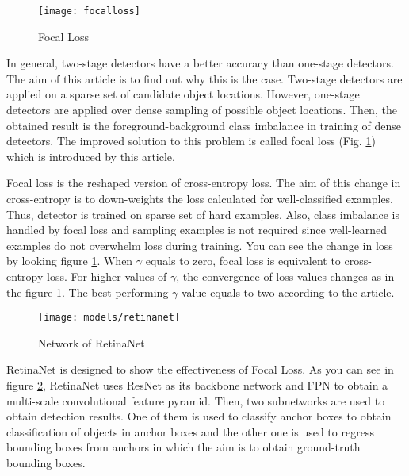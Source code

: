 \documentclass{article}
\begin{document}
\setlength{\parindent}{6ex}

\begin{figure}
    \centering
    \texttt{[image: focalloss]}
    \caption{Focal Loss}
    \label{fig:focalloss1}
\end{figure}

\indent

In general, two-stage detectors have a better accuracy than one-stage 
detectors. The aim of this article is to find out why this is the case. 
Two-stage detectors are applied on a sparse set of candidate object 
locations. However, one-stage detectors are applied over dense sampling 
of possible object locations. Then, the obtained result is the 
foreground-background class imbalance in training of dense detectors.
The improved solution to this problem is called focal loss (Fig. 
\ref{fig:focalloss1}) which is introduced by this article. \par

Focal loss is the reshaped version of cross-entropy loss. The aim of 
this change in cross-entropy is to down-weights the loss calculated for 
well-classified examples. Thus, detector is trained on sparse set of 
hard examples. Also, class imbalance is handled by focal loss and 
sampling examples is not required since well-learned examples do not 
overwhelm loss during training. You can see the change in loss by looking 
figure \ref{fig:focalloss1}. When $\gamma$ equals to zero, focal loss is 
equivalent to cross-entropy loss. For higher values of $\gamma$, the 
convergence of loss values changes as in the figure \ref{fig:focalloss1}. 
The best-performing $\gamma$ value equals to two according to the article.

\begin{figure}
    \centering
    \texttt{[image: models/retinanet]}
    \caption{Network of RetinaNet}
    \label{fig:retinanet1}
\end{figure}
\indent

RetinaNet is designed to show the effectiveness of Focal Loss. As you 
can see in figure \ref{fig:retinanet1}, RetinaNet uses ResNet as its 
backbone network and FPN to obtain a multi-scale convolutional feature 
pyramid. Then, two subnetworks are used to obtain detection results. 
One of them is used to classify anchor boxes to obtain classification of 
objects in anchor boxes and the other one is used to regress bounding 
boxes from anchors in which the aim is to obtain ground-truth bounding 
boxes.
\end{document}
